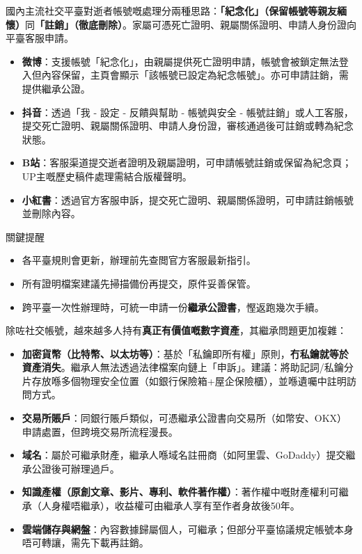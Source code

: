 
國內主流社交平臺對逝者帳號嘅處理分兩種思路：\textbf{「紀念化」（保留帳號等親友緬懷）}同\textbf{「註銷」（徹底刪除）}。家屬可憑死亡證明、親屬關係證明、申請人身份證向平臺客服申請。

\begin{itemize}
  \item \textbf{微博}：支援帳號「紀念化」，由親屬提供死亡證明申請，帳號會被鎖定無法登入但內容保留，主頁會顯示「該帳號已設定為紀念帳號」。亦可申請註銷，需提供繼承公證。
  \item \textbf{抖音}：透過「我 - 設定 - 反饋與幫助 - 帳號與安全 - 帳號註銷」或人工客服，提交死亡證明、親屬關係證明、申請人身份證，審核通過後可註銷或轉為紀念狀態。
  \item \textbf{B站}：客服渠道提交逝者證明及親屬證明，可申請帳號註銷或保留為紀念頁；UP主嘅歷史稿件處理需結合版權聲明。
  \item \textbf{小紅書}：透過官方客服申訴，提交死亡證明、親屬關係證明，可申請註銷帳號並刪除內容。
\end{itemize}

\begin{tcbinfo}{關鍵提醒}
\begin{itemize}
  \item 各平臺規則會更新，辦理前先查閲官方客服最新指引。
  \item 所有證明檔案建議先掃描備份再提交，原件妥善保管。
  \item 跨平臺一次性辦理時，可統一申請一份\textbf{繼承公證書}，慳返跑幾次手續。
\end{itemize}

\end{tcbinfo}


除咗社交帳號，越來越多人持有\textbf{真正有價值嘅數字資產}，其繼承問題更加複雜：

\begin{itemize}
  \item \textbf{加密貨幣（比特幣、以太坊等）}：基於「私鑰即所有權」原則，\textbf{冇私鑰就等於資產消失}。繼承人無法透過法律檔案向鏈上「申訴」。建議：將助記詞/私鑰分片存放喺多個物理安全位置（如銀行保險箱+屋企保險櫃），並喺遺囑中註明訪問方式。
  \item \textbf{交易所賬戶}：同銀行賬戶類似，可憑繼承公證書向交易所（如幣安、OKX）申請處置，但跨境交易所流程漫長。
  \item \textbf{域名}：屬於可繼承財產，繼承人喺域名註冊商（如阿里雲、GoDaddy）提交繼承公證後可辦理過戶。
  \item \textbf{知識產權（原創文章、影片、專利、軟件著作權）}：著作權中嘅財產權利可繼承（人身權唔繼承），收益權可由繼承人享有至作者身故後50年。
  \item \textbf{雲端儲存與網盤}：內容數據歸屬個人，可繼承；但部分平臺協議規定帳號本身唔可轉讓，需先下載再註銷。
\end{itemize}

